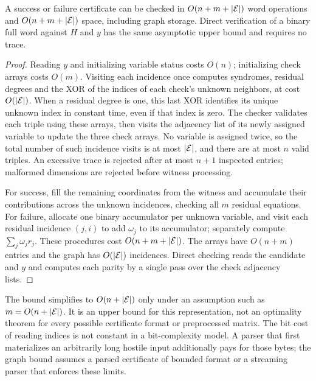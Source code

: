 \begin{prop}\label{prop:core-cost}
A success or failure certificate can be checked in
$O(n+m+|\mathcal{E}|)$ word operations and $O(n+m+|\mathcal{E}|)$ space,
including graph storage. Direct verification of a binary full word
against $H$ and $y$ has the same asymptotic upper bound and requires
no trace.
\end{prop}
\begin{proof}
Reading $y$ and initializing variable status costs $O(n)$; initializing
check arrays costs $O(m)$. Visiting each incidence once computes
syndromes, residual degrees and the XOR of the indices of each
check's unknown neighbors, at cost $O(|\mathcal{E}|)$.
When a residual degree is one, this last XOR identifies its unique
unknown index in constant time, even if that index is zero.
The checker validates each triple using these arrays, then visits
the adjacency list of its newly assigned variable to update the
three check arrays. No variable is assigned twice, so the total
number of such incidence visits is at most $|\mathcal{E}|$, and there are
at most $n$ valid triples. An excessive trace is rejected after at
most $n+1$ inspected entries; malformed dimensions are rejected
before witness processing.

For success, fill the remaining coordinates from the witness and
accumulate their contributions across the unknown incidences,
checking all $m$ residual equations. For failure, allocate one binary
accumulator per unknown variable, and visit each residual incidence
$(j,i)$ to add $\omega_j$ to its accumulator; separately compute
$\sum_j\omega_jr_j$. These procedures cost $O(n+m+|\mathcal{E}|)$.
The arrays have $O(n+m)$ entries and the graph has $O(|\mathcal{E}|)$
incidences. Direct checking reads the candidate and $y$ and computes
each parity by a single pass over the check adjacency lists.
\end{proof}

The bound simplifies to $O(n+|\mathcal{E}|)$ only under an assumption such
as $m=O(n+|\mathcal{E}|)$. It is an upper bound for this representation,
not an optimality theorem for every possible certificate format or
preprocessed matrix. The bit cost of reading indices is not constant
in a bit-complexity model. A parser that first materializes an
arbitrarily long hostile input additionally pays for those bytes;
the graph bound assumes a parsed certificate of bounded format or a
streaming parser that enforces these limits.

